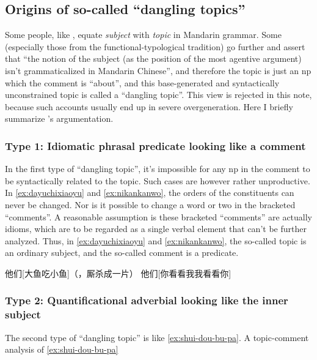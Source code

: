 \documentclass[UTF8, a4paper, oneside, scheme=plain, 12pt]{ctexrep}
\newcommand*{\citesec}[1]{\S~{#1}}
\newcommand*{\term}[1]{\emph{#1}}
\begin{document}
\subsection{Origins of so-called ``dangling topics''}\label{sec:topic-subject}

Some people, like \citet[\citesec{7.1}]{zhudexigrammar},
equate \term{subject} with \term{topic} in Mandarin grammar.
Some (especially those from the functional-typological tradition) go further 
and assert that ``the notion of the subject (as the position of the most agentive argument) 
isn't grammaticalized in Mandarin Chinese'',
and therefore the topic is just an \acs{np} which the comment is ``about'',
and this base-generated and syntactically unconstrained topic 
is called a ``dangling topic''.
This view is rejected in this note,
because such accounts usually end up in severe overgeneration. 
Here I briefly summarize \citet{sih2000topic}'s argumentation.

\subsubsection{Type 1: Idiomatic phrasal predicate looking like a comment}\label{sec:clause.dangling-topic.1}

In the first type of ``dangling topic'',
it's impossible for any \acs{np} in the comment to be syntactically related to the topic.
Such cases are however rather unproductive. 
In \eqref{ex:dayuchixiaoyu} and \eqref{ex:nikankanwo},
the orders of the constituents can never be changed.
Nor is it possible to change a word or two in the bracketed ``comments''.
A reasonable assumption is these bracketed ``comments''
are actually idioms, 
which are to be regarded as a single verbal element that can't be further analyzed.
Thus, in \eqref{ex:dayuchixiaoyu} and \eqref{ex:nikankanwo},
the so-called topic is an ordinary subject,
and the so-called comment is a predicate.

\begin{exe}
    \ex\label{ex:dayuchixiaoyu} 他们[大鱼吃小鱼]（，厮杀成一片）
    \ex\label{ex:nikankanwo} 他们[你看看我我看看你]
\end{exe}

\subsubsection{Type 2: Quantificational adverbial looking like the inner subject}

The second type of ``dangling topic'' is like \eqref{ex:shui-dou-bu-pa}.
A topic-comment analysis of \eqref{ex:shui-dou-bu-pa} 
\end{document}
